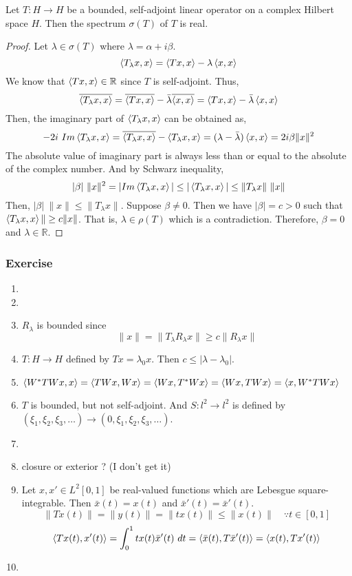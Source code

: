 \begin{theorem}[Spectrum]
	Let $T : H \to H$ be a bounded, self-adjoint linear operator on a complex Hilbert space $H$.
	Then the spectrum $\sigma(T)$ of $T$ is real.
\end{theorem}
\begin{proof}
	Let $\lambda \in \sigma(T)$ where $\lambda = \alpha + i\beta$.
	\[ \left\langle T_\lambda x,x \right\rangle = \left\langle Tx,x \right\rangle - \lambda\left\langle x,x \right\rangle \]
	We know that $\left\langle Tx,x \right\rangle \in \mathbb{R}$ since $T$ is self-adjoint.
	Thus,
	\[ \overline{\left\langle T_\lambda x ,x \right\rangle} = \overline{\left\langle Tx,x \right\rangle} - \bar{\lambda}\overline{\left\langle x,x \right\rangle} = \left\langle Tx,x \right\rangle - \bar{\lambda}\left\langle x,x \right\rangle \]
	Then, the imaginary part of $\left\langle T_\lambda x,x \right\rangle$ can be obtained as,
	\[ -2i\ Im \left\langle T_\lambda x,x \right\rangle = \overline{\left\langle T_\lambda x,x \right\rangle} - \left\langle T_\lambda x,x \right\rangle = (\lambda-\bar{\lambda})\left\langle x,x \right\rangle = 2i\beta \|x\|^2 \]
	The absolute value of imaginary part is always less than or equal to the absolute of the complex number.
	And by Schwarz inequality,
	\[ |\beta|\ \|x\|^2 = |Im\left\langle T_\lambda x,x \right\rangle| \le |\left\langle T_\lambda x,x \right\rangle| \le \|T_\lambda x\|\ \|x\| \]
	Then, $|\beta|\ \|x\| \le \|T_\lambda x\|$.
	Suppose $\beta \ne 0$.
	Then we have $|\beta| = c > 0$ such that $\left\langle T_\lambda x,x \right\rangle \| \ge c\|x\|$.
	That is, $\lambda \in \rho(T)$ which is a contradiction.
	Therefore, $\beta = 0$ and $\lambda \in \mathbb{R}$.
\end{proof}

\subsubsection{Exercise}
\begin{enumerate}
	\item 
	\item
	\item $R_\lambda$ is bounded since
		\[ \|x\| = \|T_\lambda R_\lambda x\| \ge c\|R_\lambda x\| \]
	\item $T : H \to H$ defined by $Tx = \lambda_0 x$.
		Then $c \le |\lambda-\lambda_0|$.
	\item $\left\langle W^\ast TWx,x \right\rangle = \left\langle TWx,Wx \right\rangle = \left\langle Wx,T^\ast Wx \right\rangle = \left\langle Wx,TWx \right\rangle = \left\langle x,W^\ast TWx \right\rangle$ 
	\item $T$ is bounded, but not self-adjoint.
		And $S:l^2 \to l^2$ is defined by $(\xi_1,\xi_2,\xi_3,\dots) \to (0,\xi_1,\xi_2,\xi_3,\dots)$.
	\item
	\item closure or exterior ? (I don't get it)
	\item Let $x,x' \in L^2[0,1]$ be real-valued functions which are Lebesgue square-integrable.
		Then $\bar{x}(t) = x(t)$ and $\bar{x}'(t) = \bar{x}'(t)$.
		\[ \|Tx(t)\| = \|y(t)\| = \|tx(t)\| \le \|x(t)\|\quad \because t \in [0,1] \]
		\[ \left\langle Tx(t),x'(t) \right\rangle = \int_0^1 tx(t)\bar{x}'(t)\ dt = \left\langle \bar{x}(t),T\bar{x}'(t) \right\rangle = \left\langle x(t),Tx'(t) \right\rangle \]
	\item
\end{enumerate}

